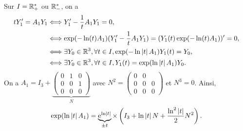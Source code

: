 \documentclass[12pt]{article}
\begin{document}
\begin{remark}
	Sur $I=\mathbb{R}_{+}^{*}$ ou $\mathbb{R}_{-}^{*}$, on a 
	\begin{align}
		tY_1'=A_1Y_1
		&\Longleftrightarrow Y_1'-\frac{1}{t}A_1Y_1=0,\\
		&\Longleftrightarrow \exp(-\ln(t)A_1)(Y_1'-\frac{1}{t}A_1 Y_1)=(Y_1(t)\exp(-\ln(t)A_1))'=0,\\
		&\Longleftrightarrow \exists Y_0\in\mathbb{R}^{3}, \forall t\in I, \exp(-\ln\left\lvert t\right\rvert A_1)Y_1(t)=Y_0,\\
		&\Longleftrightarrow \exists Y_0\in\mathbb{R}^{3}, \forall t\in I, Y_1(t)=\exp(\ln\left\lvert t\right\rvert A_1)Y_0.
	\end{align}
	On a $A_1=I_3+\underbrace{
		\begin{pmatrix}
			0&1&0\\0&0&1\\0&0&0
		\end{pmatrix}
	}_{N}$ avec $N^{2}=
	\begin{pmatrix}
		0&0&\\0&0&0\\0&0&0
	\end{pmatrix}$ et $N^{3}=0$. Ainsi, 
	\begin{equation}
		\exp(\ln\left\lvert t\right\rvert A_1)=\underbrace{\mathrm{e}^{\ln\left\lvert t\right\rvert}}_{\pm t}\times\left(I_3+\ln\left\lvert t\right\rvert N+\frac{\ln^{2}\left\lvert t\right\rvert}{2}N^{2}\right).
	\end{equation}
\end{remark}
\end{document}
